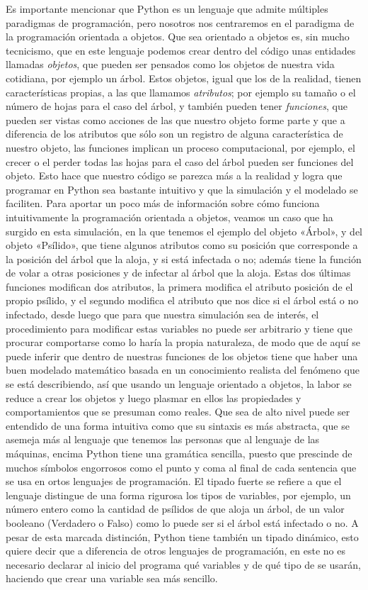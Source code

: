 Es importante mencionar que Python es un lenguaje que admite múltiples paradigmas de programación, pero nosotros nos centraremos en el paradigma de la programación orientada a objetos. Que sea orientado a objetos es, sin mucho tecnicismo, que en este lenguaje podemos crear dentro del código unas entidades llamadas \textit{objetos}, que pueden ser pensados como los objetos de nuestra vida cotidiana, por ejemplo un árbol. Estos objetos, igual que los de la realidad, tienen características propias, a las que llamamos \textit{atributos}; por ejemplo su tamaño o el número de hojas para el caso del árbol, y también pueden tener \textit{funciones}, que pueden ser vistas como acciones de las que nuestro objeto forme parte y que a diferencia de los atributos que sólo son un registro de alguna característica de nuestro objeto, las funciones implican un proceso computacional, por ejemplo, el crecer o el perder todas las hojas para el caso del árbol pueden ser funciones del objeto. Esto hace que nuestro código se parezca más a la realidad y logra que programar en Python sea bastante intuitivo y que la simulación y el modelado se faciliten. Para aportar un poco más de información sobre cómo funciona intuitivamente la programación orientada a objetos, veamos un caso que ha surgido en esta simulación, en la que tenemos el ejemplo del objeto «Árbol», y del objeto «Psílido», que tiene algunos atributos como su posición que corresponde a la posición del árbol que la aloja, y si está infectada o no; además tiene la función de volar a otras posiciones y de infectar al árbol que la aloja. Estas dos últimas funciones modifican dos atributos, la primera modifica el atributo posición de el propio psílido, y el segundo modifica el atributo que nos dice si el árbol está o no infectado, desde luego que para que nuestra simulación sea de interés, el procedimiento para modificar estas variables no puede ser arbitrario y tiene que procurar comportarse como lo haría la propia naturaleza, de modo que de aquí se puede inferir que dentro de nuestras funciones de los objetos tiene que haber una buen modelado matemático basada en un conocimiento realista del fenómeno que se está describiendo, así que usando un lenguaje orientado a objetos, la labor se reduce a crear los objetos y luego plasmar en ellos las propiedades y comportamientos que se presuman como reales. Que sea de alto nivel puede ser entendido de una forma intuitiva como que su sintaxis es más abstracta, que se asemeja más al lenguaje que tenemos las personas que al lenguaje de las máquinas, encima Python tiene una gramática sencilla, puesto que prescinde de muchos símbolos engorrosos como el punto y coma al final de cada sentencia que se usa en ortos lenguajes de programación. El tipado fuerte se refiere a que el lenguaje distingue de una forma rigurosa los tipos de variables, por ejemplo, un número entero como la cantidad de psílidos de  que aloja un árbol, de un valor booleano (Verdadero o Falso) como lo puede ser si el árbol está infectado o no. A pesar de esta marcada distinción, Python tiene también un tipado dinámico, esto quiere decir que a diferencia de otros lenguajes de programación, en este no es necesario declarar al inicio del programa qué variables y de qué tipo de se usarán, haciendo que crear una variable sea más sencillo.
